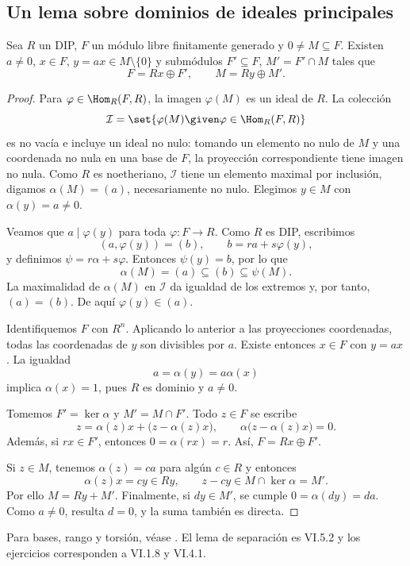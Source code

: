 \subsection{Un lema sobre dominios de ideales principales}
\begin{lema}\label{lema:C20-separacion}
Sea $R$ un DIP, $F$ un módulo libre finitamente generado y $0\ne M\subseteq F$. Existen $a\ne0$, $x\in F$, $y=ax\in M\setminus\{0\}$ y submódulos $F'\subseteq F$, $M'=F'\cap M$ tales que
\[
F=Rx\oplus F',\qquad M=Ry\oplus M'.
\]
\end{lema}
\begin{proof}
Para $\varphi\in\Hom_R(F,R)$, la imagen $\varphi(M)$ es un ideal de $R$. La colección
\[
\mathcal I=\set{\varphi(M)\given \varphi\in\Hom_R(F,R)}
\]
es no vacía e incluye un ideal no nulo: tomando un elemento no nulo de $M$ y una coordenada no nula en una base de $F$, la proyección correspondiente tiene imagen no nula. Como $R$ es noetheriano, $\mathcal I$ tiene un elemento maximal por inclusión, digamos $\alpha(M)=(a)$, necesariamente no nulo. Elegimos $y\in M$ con $\alpha(y)=a\ne0$.

Veamos que $a\mid\varphi(y)$ para toda $\varphi:F\to R$. Como $R$ es DIP, escribimos
\[
(a,\varphi(y))=(b),\qquad b=ra+s\varphi(y),
\]
y definimos $\psi=r\alpha+s\varphi$. Entonces $\psi(y)=b$, por lo que
\[
\alpha(M)=(a)\subseteq(b)\subseteq\psi(M).
\]
La maximalidad de $\alpha(M)$ en $\mathcal I$ da igualdad de los extremos y, por tanto, $(a)=(b)$. De aquí $\varphi(y)\in(a)$.

Identifiquemos $F$ con $R^n$. Aplicando lo anterior a las proyecciones coordenadas, todas las coordenadas de $y$ son divisibles por $a$. Existe entonces $x\in F$ con $y=ax$. La igualdad
\[
a=\alpha(y)=a\alpha(x)
\]
implica $\alpha(x)=1$, pues $R$ es dominio y $a\ne0$.

Tomemos $F'=\ker\alpha$ y $M'=M\cap F'$. Todo $z\in F$ se escribe
\[
z=\alpha(z)x+\bigl(z-\alpha(z)x\bigr),\qquad
\alpha\bigl(z-\alpha(z)x\bigr)=0.
\]
Además, si $rx\in F'$, entonces $0=\alpha(rx)=r$. Así, $F=Rx\oplus F'$.

Si $z\in M$, tenemos $\alpha(z)=ca$ para algún $c\in R$ y entonces
\[
\alpha(z)x=cy\in Ry,\qquad z-cy\in M\cap\ker\alpha=M'.
\]
Por ello $M=Ry+M'$. Finalmente, si $dy\in M'$, se cumple $0=\alpha(dy)=da$. Como $a\ne0$, resulta $d=0$, y la suma también es directa.
\end{proof}

\begin{obs}
Para bases, rango y torsión, véase \citet[cap.~VI, 1.1/4--7/9--11/13--14 y 4.1--3]{aluffi2009}. El lema de separación es VI.5.2 y los ejercicios corresponden a VI.1.8 y VI.4.1.
\end{obs}
